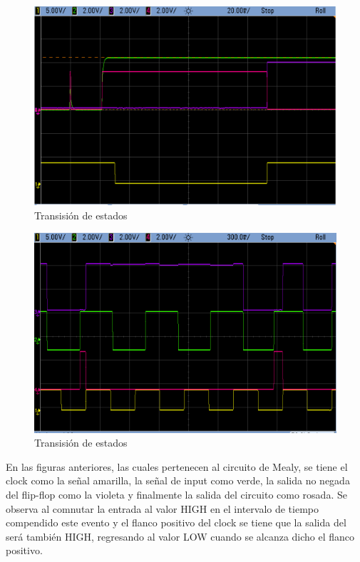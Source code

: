 \begin{figure}[H]
\begin{centering}
\includegraphics[scale=0.5]{../Ejercicio-3/imagenes/e3_tp3.png}
\par\end{centering}
\caption{Transisión de estados}

\end{figure}

\begin{figure}[H]
\begin{centering}
\includegraphics[scale=0.5]{../Ejercicio-3/imagenes/e3_tp3_b.png}
\par\end{centering}
\caption{Transisión de estados}

\end{figure}

En las figuras anteriores, las cuales pertenecen al circuito de Mealy, se tiene el clock como la señal amarilla, la señal de input como verde, la salida no negada del flip-flop como la violeta y finalmente la salida del circuito como rosada. Se observa al comnutar la entrada al valor HIGH en el intervalo de tiempo compendido este evento y el flanco positivo del clock se tiene que la salida del será también HIGH, regresando al valor LOW cuando se alcanza dicho el flanco positivo.